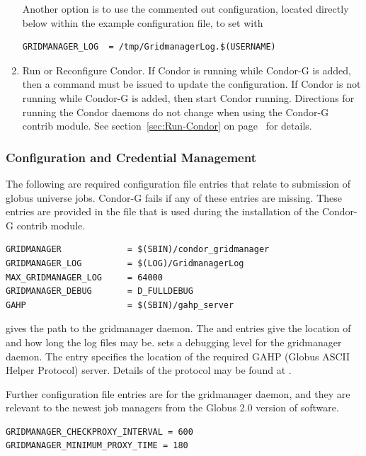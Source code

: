 \begin{enumerate}
Another option is to use the commented out configuration, located
directly below within the example configuration file,
to set  with
\begin{verbatim}
GRIDMANAGER_LOG  = /tmp/GridmanagerLog.$(USERNAME)
\end{verbatim}

\item{Run or Reconfigure Condor.}
If Condor is running while Condor-G is added, then a
 command must be issued to update
the configuration.
If Condor is not running while Condor-G is added, then 
start Condor running.
Directions for running the Condor daemons do not change when using
the Condor-G contrib module.
See section~\ref{sec:Run-Condor} on page~\pageref{sec:Run-Condor}
for details.
\end{enumerate}

\subsubsection{\label{sec:Condor-G-Credentials}Configuration and Credential Management}

The following are required configuration file entries that
relate to submission of globus universe jobs.
Condor-G fails if any of these entries are missing.
These entries are provided in the file
that is used during the installation of the Condor-G contrib module.

\footnotesize
\begin{verbatim}
GRIDMANAGER             = $(SBIN)/condor_gridmanager
GRIDMANAGER_LOG         = $(LOG)/GridmanagerLog
MAX_GRIDMANAGER_LOG     = 64000
GRIDMANAGER_DEBUG       = D_FULLDEBUG
GAHP                    = $(SBIN)/gahp_server
\end{verbatim} 
\normalsize

gives the path to the gridmanager daemon.
The 
and
entries give the location of and how long
the log files may be.
sets a debugging level for the gridmanager daemon.
The
 entry specifies the location of the required
GAHP (Globus ASCII Helper Protocol) server.
Details of the protocol may be found at
.

Further configuration file entries are for the gridmanager daemon,
and they are relevant to
the newest job managers from the Globus 2.0 version of software.
\begin{verbatim}
GRIDMANAGER_CHECKPROXY_INTERVAL = 600
GRIDMANAGER_MINIMUM_PROXY_TIME = 180
\end{verbatim} 

